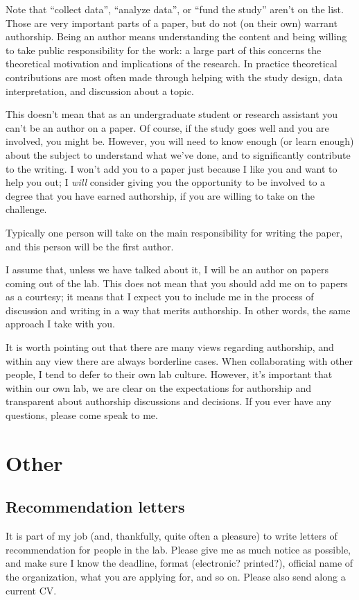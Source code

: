 \documentclass[letterpaper,12pt,oneside]{memoir}
\begin{document}
Note that ``collect data'', ``analyze data'', or ``fund the study'' aren't on the list. Those are very important parts of a paper, but do not (on their own) warrant authorship. Being an author means understanding the content and being willing to take public responsibility for the work: a large part of this concerns the theoretical motivation and implications of the research. In practice theoretical contributions are most often made through helping with the study design, data interpretation, and discussion about a topic.

This doesn't mean that as an undergraduate student or research assistant you can't be an author on a paper. Of course, if the study goes well and you are involved, you might be. However, you will need to know enough (or learn enough) about the subject to understand what we've done, and to significantly contribute to the writing. I won't add you to a paper just because I like you and want to help you out; I {\itshape will} consider giving you the opportunity to be involved to a degree that you have earned authorship, if you are willing to take on the challenge.

Typically one person will take on the main responsibility for writing the paper, and this person will be the first author.

I assume that, unless we have talked about it, I will be an author on papers coming out of the lab. This does not mean that you should add me on to papers as a courtesy; it means that I expect you to include me in the process of discussion and writing in a way that merits authorship. In other words, the same approach I take with you.

It is worth pointing out that there are many views regarding authorship, and within any view there are always borderline cases. When collaborating with other people, I tend to defer to their own lab culture. However, it's important that within our own lab, we are clear on the expectations for authorship and transparent about authorship discussions and decisions. If you ever have any questions, please come speak to me.


\chapter{Other}
\section{Recommendation letters}
It is part of my job (and, thankfully, quite often a pleasure) to write letters of recommendation for people in the lab. Please give me as much notice as possible, and make sure I know the deadline, format (electronic? printed?), official name of the organization, what you are applying for, and so on. Please also send along a current CV.
\end{document}
